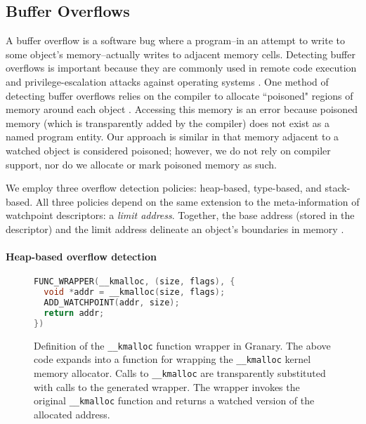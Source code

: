 \documentclass[letterpaper,twocolumn,10pt]{article}
\let\ORIGcaption\caption
\renewcommand{\caption}[2][\compressedcaption]{%
\def\compressedcaption{#2}%
    \vspace{-12pt}%
    \ORIGcaption[#1]{#2}}
\newcommand{\comment}[1]{}
\begin{document}
\subsection{Buffer Overflows \label{sec:buffer_overflows}}
A buffer overflow is a software bug where a program--in an attempt to write to some object's memory--actually writes to adjacent memory cells. Detecting buffer overflows is important because they are commonly used in remote code execution and privilege-escalation attacks against operating systems \cite{SecureProgramExecFlowTracking}. One method of detecting buffer overflows relies on the compiler to allocate ``poisoned" regions of memory around each object \cite{AddressSanitizer}. Accessing this memory is an error because poisoned memory (which is transparently added by the compiler) does not exist as a named program entity. Our approach is similar in that memory adjacent to a watched object is considered poisoned; however, we do not rely on compiler support, nor do we allocate or mark poisoned memory as such.

We employ three overflow detection policies: heap-based, type-based, and stack-based. \comment{For uniformity, the blind policy is a special case of the targeted policy.} All three policies depend on the same extension to the meta-information of watchpoint descriptors: a \emph{limit address}. Together, the base address (stored in the descriptor) and the limit address delineate an object's boundaries in memory \cite{BccFatPointers}.

\paragraph{Heap-based overflow detection \label{sec:heap_overflow}}
\begin{figure}
\begin{lstlisting}[language=C,basicstyle=\footnotesize\ttfamily]
FUNC_WRAPPER(__kmalloc, (size, flags), {
  void *addr = __kmalloc(size, flags);
  ADD_WATCHPOINT(addr, size);
  return addr;
})
\end{lstlisting}
\caption{\label{fig:kmalloc_wrapper}Definition of the \texttt{\_\_kmalloc} function wrapper in Granary. The above code expands into a function for wrapping the \texttt{\_\_kmalloc} kernel memory allocator. Calls to \texttt{\_\_kmalloc} are transparently substituted with calls to the generated wrapper. The wrapper invokes the original \texttt{\_\_kmalloc} function and returns a watched version of the allocated address.}
\end{figure}
\end{document}
